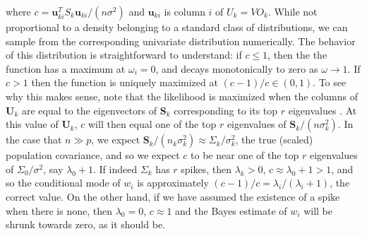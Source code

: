 \documentclass{article}
\newcommand{\bl}[1]{{\mathbf #1}}
\begin{document}
where $c = \bl u_{ki}^T S_k \bl u_{ki}/(n \sigma^2)$ and $\bl u_{ki}$ is
column $i$ of $U_k = VO_k$.  While not proportional to a density
belonging to a standard class of distributions, we can sample from the
corresponding univariate distribution numerically.  The behavior of
this distribution is straightforward to understand: if $c\leq 1$, then
the the function has a maximum at $\omega_i =0$, and decays
monotonically to zero as $\omega \rightarrow 1$.  If $c>1$ then the
function is uniquely maximized at $(c-1)/c \in (0,1)$.  To see why
this makes sense, note that the likelihood is maximized when the
columns of $\bl U_k$ are equal to the eigenvectors of $\bl S_k$
corresponding to its top $r$ eigenvalues
\citep{Tipping1999}. At this value of $\bl U_k$, $c$ will then
equal one of the top $r$ eigenvalues of $\bl S_k/(n\sigma_k^2)$.  In the
case that $n\gg p$, we expect
$\bl S_k/(n_k\sigma_k^2)\approx \Sigma_k/\sigma_k^2$, the true (scaled)
population covariance, and so we expect $c$ to be near one of the top
$r$ eigenvalues of $\Sigma_0/\sigma^2$, say $\lambda_0+1$.  If indeed
$\Sigma_k$ has $r$ spikes, then $\lambda_k>0$,
$c \approx \lambda_0 +1 > 1$, and so the conditional mode of $w_i$ is
approximately $(c-1)/c = \lambda_i/(\lambda_i+1)$, the correct value.
On the other hand, if we have assumed the existence of a spike when
there is none, then $\lambda_0=0$, $c\approx 1$ and the Bayes estimate
of $w_i$ will be shrunk towards zero, as it should be.






\end{document}

